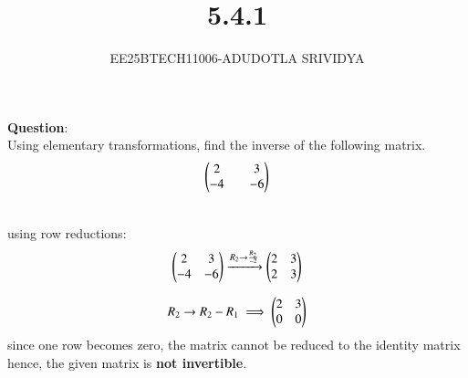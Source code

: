 \documentclass[journal]{IEEEtran}
\begin{document}

\vspace{3cm}

\title{5.4.1}
\author{EE25BTECH11006-ADUDOTLA SRIVIDYA}
 \maketitle
{\let\newpage\relax\maketitle}

\renewcommand{\thetable}{\theenumi}

\textbf{Question}:\\
Using elementary transformations, find the inverse of the following matrix. 
\begin{align*}
    \begin{pmatrix}2&&3\\-4&&-6\end{pmatrix}
\end{align*}

\solution \\
using row reductions:
\begin{align}
    \begin{pmatrix}2&3\\-4&-6\end{pmatrix} 
    \xrightarrow[]{R_2 \rightarrow \frac{R_2}{-2}} 
    \begin{pmatrix}2&3\\2&3\end{pmatrix}
\end{align}

\begin{align}
    R_2 \rightarrow R_2 - R_1 \implies \begin{pmatrix}2&3 \\ 0&0\end{pmatrix}
\end{align}
since one row becomes zero, the matrix cannot be reduced to the identity matrix
\\
hence, the given matrix is \textbf{not invertible}.
\end{document}
